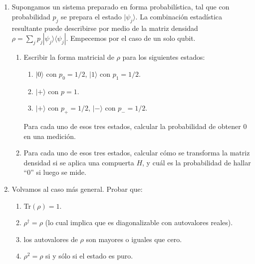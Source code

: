 \documentclass[a4paper,11pt,spanish]{article}
\newcommand{\ket}[1]{|#1\rangle}
\newcommand{\bra}[1]{\langle #1|}
\newcommand{\ketbra}[2]{\ket{#1}\bra{#2}}
\newcommand{\proj}[1]{\ketbra {#1}{#1}}
\begin{document}
\\

\\

\vspace{10pt}

\begin{enumerate}
\item Supongamos un sistema preparado en forma probabilística, tal que con probabilidad $p_j$ se prepara el estado $\ket{\psi_j}$. La combinación estadística resultante puede describirse por medio de la matriz densidad $\rho = \sum_j p_j \proj{\psi_j}$. Empecemos por el caso de un solo qubit.
\begin{enumerate}
 \item Escribir la forma matricial de $\rho$ para los siguientes estados:
 \begin{enumerate}
  \item $\ket{0}$ con $p_0=1/2$, $\ket{1}$ con $p_1=1/2$.
  \item $\ket{+}$ con $p=1$.
  \item $\ket{+}$ con $p_+=1/2$, $\ket{-}$ con $p_-=1/2$.
 \end{enumerate}
 Para cada uno de esos tres estados, calcular la probabilidad de obtener 0 en una medici\'on.

 \item Para cada uno de esos tres estados, calcular cómo se transforma la matriz densidad si se aplica una compuerta $H$, y cuál es la probabilidad de hallar ``0'' si luego se mide.
\end{enumerate}

\item Volvamos al caso más general. Probar que:
 \begin{enumerate}
  \item Tr$(\rho)=1$.
  \item $\rho^\dagger=\rho$ (lo cual implica que es diagonalizable con autovalores reales).
  \item los autovalores de $\rho$ son mayores o iguales que cero.
  \item $\rho^2 =\rho$ si y s\'olo si el estado es puro.
\end{enumerate}



\end{enumerate}
\end{document}
